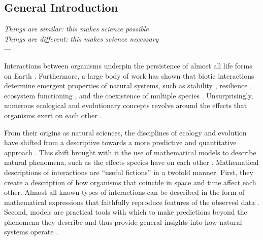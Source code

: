 \begin{refsection}
\chapter{General Introduction} %
\label{Intro}
\begin{flushright}{\slshape
    Things are similar: this makes science possible \\
    Things are different: this makes science necessary
    } \\ \medskip
    --- \textcite{levins_dialectics_1980}
\end{flushright}

\bigskip

Interactions between organisms underpin the persistence of almost all life forms on Earth \citep{lawton1999there}. Furthermore, a large body of work has shown that biotic interactions determine emergent properties of natural systems, such as stability \citep{may1972will, wootton2016many,song2018will}, resilience \citep{capdevila2021reconciling}, ecosystem functioning \citep{turnbull2013coexistence,godoy2020excess}, and the coexistence of multiple species \citep{chesson2000mechanisms,saavedra2017structural}. Unsurprisingly, numerous ecological and evolutionary concepts revolve around the effects that organisms exert on each other \citep{gause_experimental_1934,macarthur1967limiting,thompson1999evolution, hillerislambers2012rethinking, chase2009ecological,thompson2014interaction}.

From their origins as natural sciences, the disciplines of ecology and evolution have shifted from a descriptive towards a more predictive and quantitative approach \citep{holling1966strategy,pickett1980non,simberloff2004community,marquet2014theory,lassig2017predicting,rossberg2019let}. This shift brought with it the use of mathematical models to describe natural phenomena, such as the effects species have on each other \citep{holling1966strategy,levins1966strategy,maynard1978models,servedio2014not}. Mathematical descriptions of interactions are ``useful fictions'' \citep{box2011statistical} in a twofold manner. First, they create a description of how organisms that coincide in space and time affect each other. Almost all known types of interactions can be described in the form of mathematical expressions that faithfully reproduce features of the observed data \citep{volterra1926fluctuations,holling1959some,holt1977predation,adler2018competition,wood1999super,holland2002population,vazquez2005interaction,stouffer2021hidden}. Second, models are practical tools with which to make predictions beyond the phenomena they describe and thus provide general insights into how natural systems operate \citep{sutherland2006predicting,stouffer2019all}.



\end{refsection}
